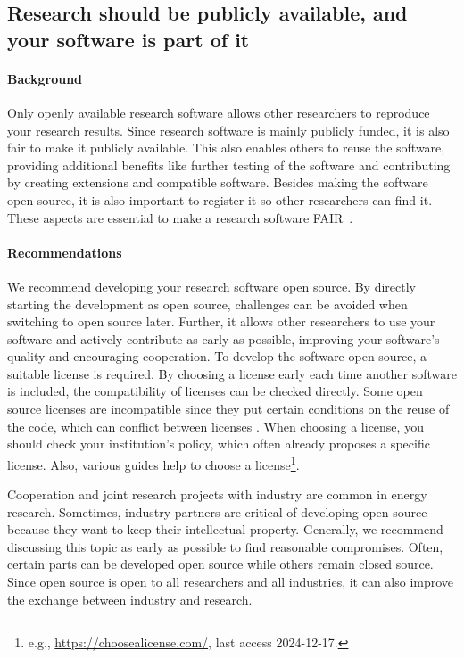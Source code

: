 \subsection{Research should be publicly available, and your software is part of it}\label{sec:openSource}

\paragraph{Background} Only openly available research software allows other researchers to reproduce your research results. Since research software is mainly publicly funded, it is also fair to make it publicly available. This also enables others to reuse the software, providing additional benefits like further testing of the software and contributing by creating extensions and compatible software. Besides making the software open source, it is also important to register it so other researchers can find it. These aspects are essential to make a research software \ac{FAIR}~\cite{barker2022introducing}. 

\paragraph{Recommendations} We recommend developing your research software open source. By directly starting the development as open source, challenges can be avoided when switching to open source later. Further, it allows other researchers to use your software and actively contribute as early as possible, improving your software's quality and encouraging cooperation. To develop the software open source, a suitable license is required. By choosing a license early each time another software is included, the compatibility of licenses can be checked directly. Some open source licenses are incompatible since they put certain conditions on the reuse of the code, which can conflict between licenses \cite{cui_empirical_2023}.
When choosing a license, you should check your institution's policy, which often already proposes a specific license. Also, various guides help to choose a license\footnote{e.g., \url{https://choosealicense.com/}, last access 2024-12-17.}.

Cooperation and joint research projects with industry are common in energy research. Sometimes, industry partners are critical of developing open source because they want to keep their intellectual property. Generally, we recommend discussing this topic as early as possible to find reasonable compromises. Often, certain parts can be developed open source while others remain closed source. Since open source is open to all researchers and all industries, it can also improve the exchange between industry and research. 

